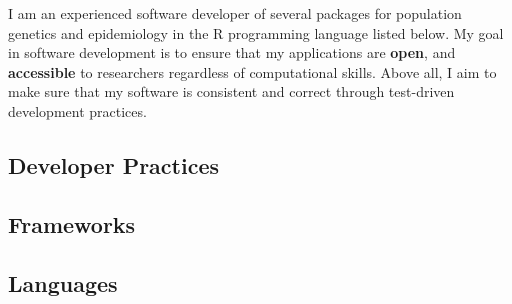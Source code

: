 
I am an experienced software developer of several packages for population
genetics and epidemiology in the R programming language listed below. My goal
in software development is to ensure that my applications are \textbf{open},
and \textbf{accessible} to researchers regardless of computational skills. Above
all, I aim to make sure that my software is consistent and correct through
test-driven development practices. 

\subsection{Developer Practices}


\subsection{Frameworks}


\subsection{Languages}

